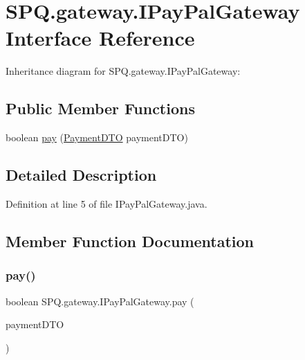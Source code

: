 \hypertarget{interface_s_p_q_1_1gateway_1_1_i_pay_pal_gateway}{}\section{S\+P\+Q.\+gateway.\+I\+Pay\+Pal\+Gateway Interface Reference}
\label{interface_s_p_q_1_1gateway_1_1_i_pay_pal_gateway}


Inheritance diagram for S\+P\+Q.\+gateway.\+I\+Pay\+Pal\+Gateway\+:
\subsection*{Public Member Functions}
\begin{DoxyCompactItemize}
\item 
boolean \mbox{\hyperlink{interface_s_p_q_1_1gateway_1_1_i_pay_pal_gateway_a064ef641b0db9c4a6d0de59089a108bf}{pay}} (\mbox{\hyperlink{class_s_p_q_1_1dto_1_1_payment_d_t_o}{Payment\+D\+TO}} payment\+D\+TO)
\end{DoxyCompactItemize}


\subsection{Detailed Description}


Definition at line 5 of file I\+Pay\+Pal\+Gateway.\+java.



\subsection{Member Function Documentation}
\mbox{\label{interface_s_p_q_1_1gateway_1_1_i_pay_pal_gateway_a064ef641b0db9c4a6d0de59089a108bf}} 
\subsubsection{\texorpdfstring{pay()}{pay()}}
{\footnotesize\ttfamily boolean S\+P\+Q.\+gateway.\+I\+Pay\+Pal\+Gateway.\+pay (\begin{DoxyParamCaption}\item[{\mbox{\hyperlink{class_s_p_q_1_1dto_1_1_payment_d_t_o}{Payment\+D\+TO}}}]{payment\+D\+TO }\end{DoxyParamCaption})}




